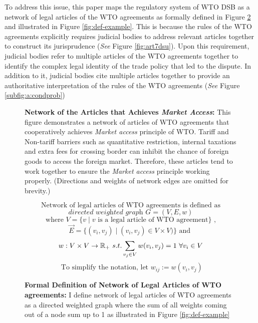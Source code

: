 To address this issue,
this paper maps
the regulatory system of WTO DSB
as a network of legal articles
of the WTO agreements as formally defined in Figure \ref{fig:def} and illustrated in Figure \ref{fig:def-example}. This is because the rules of the WTO agreements
explicitly requires judicial bodies to address
relevant articles together to construct its jurisprudence (\textit{See} Figure \ref{fig:art7dsu}).
Upon this requirement, judicial bodies refer to
multiple articles of the WTO agreements together
to identify the complex legal identity of the trade policy that led to the dispute.
In addition to it, judicial bodies cite multiple articles together
to provide an authoritative interpretation of the rules of the WTO agreements (\textit{See} Figure \ref{subfig:a:condprob})

\begin{figure}
    \centering{
        
    }
    \caption{{\bf Network of the Articles that Achieves \textit{Market Access}:}
        This figure demonstrates a network of articles of WTO agreements
        that cooperatively achieves \textit{Market access} principle of WTO.
        Tariff and Non-tariff barriers such as quantitative restriction, internal taxations
        and extra fees for crossing border can inhibit the chance of foreign goods to access the foreign market.
        Therefore, these articles tend to work together to ensure the \textit{Market access} principle working properly.
        (Directions and weights of network edges are omitted for brevity.)
    }
    \label{fig:market-aceess_directed}
\end{figure}

\begin{figure}[ht]
    \[\text{Network of legal articles of WTO agreements is defined as}\] %
    \[ \textit{directed weighted graph }G = (V, E, w) \]
    \[\text{ where } V = \{v \mid v\text{ is a legal article of WTO agreement}\}  \text{ , } \]
    \[\vec{E} = \{(v_i, v_j) \mid (v_i, v_j)\in V \times V)\} \text{ and } \]
    \[w : V \times V \to \Bbb R_{+} \text{ } s.t. \sum_{v_j\in V}{w(v_i, v_j)} = 1 \text{ } \forall v_i \in V \]%
    \[\text{ To simplify the notation, let } w_{ij} := w(v_i, v_j)\]
    \caption{\textbf{Formal Definition of Network of Legal Articles of WTO agreements: }I define network of legal articles of WTO agreements
        as a directed weighted graph where the sum of all weights coming out of a node sum up to 1 as illustrated in Figure \ref{fig:def-example}}
    \label{fig:def}
\end{figure}

